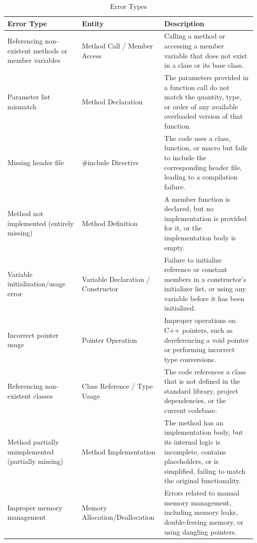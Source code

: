 \begin{table}[htbp]
  \centering
  \caption{Error Types}
  \label{tab:error-types}
  \begin{tabularx}{\textwidth}{XXX}
    \hline
    \textbf{Error Type} & \textbf{Entity} & \textbf{Description} \\
    \hline
    Referencing non-existent methods or member variables & Method Call / Member Access & Calling a method or accessing a member variable that does not exist in a class or its base class. \\
    Parameter list mismatch & Method Declaration & The parameters provided in a function call do not match the quantity, type, or order of any available overloaded version of that function. \\
    Missing header file & \#include Directive & The code uses a class, function, or macro but fails to include the corresponding header file, leading to a compilation failure. \\
    Method not implemented (entirely missing) & Method Definition & A member function is declared, but no implementation is provided for it, or the implementation body is empty. \\
    Variable initialization/usage error & Variable Declaration / Constructor & Failure to initialize reference or constant members in a constructor's initializer list, or using any variable before it has been initialized. \\
    Incorrect pointer usage & Pointer Operation & Improper operations on C++ pointers, such as dereferencing a void pointer or performing incorrect type conversions. \\
    Referencing non-existent classes & Class Reference / Type Usage & The code references a class that is not defined in the standard library, project dependencies, or the current codebase. \\
    Method partially unimplemented (partially missing) & Method Implementation & The method has an implementation body, but its internal logic is incomplete, contains placeholders, or is simplified, failing to match the original functionality. \\
    Improper memory management & Memory Allocation/Deallocation & Errors related to manual memory management, including memory leaks, double-freeing memory, or using dangling pointers. \\
    \hline
  \end{tabularx}
\end{table}

